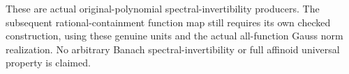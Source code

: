 \begin{remark}
These are actual original-polynomial spectral-invertibility producers. The
subsequent rational-containment function map still requires its own checked
construction, using these genuine units and the actual all-function Gauss norm
realization. No arbitrary Banach spectral-invertibility or full affinoid
universal property is claimed.
\end{remark}
